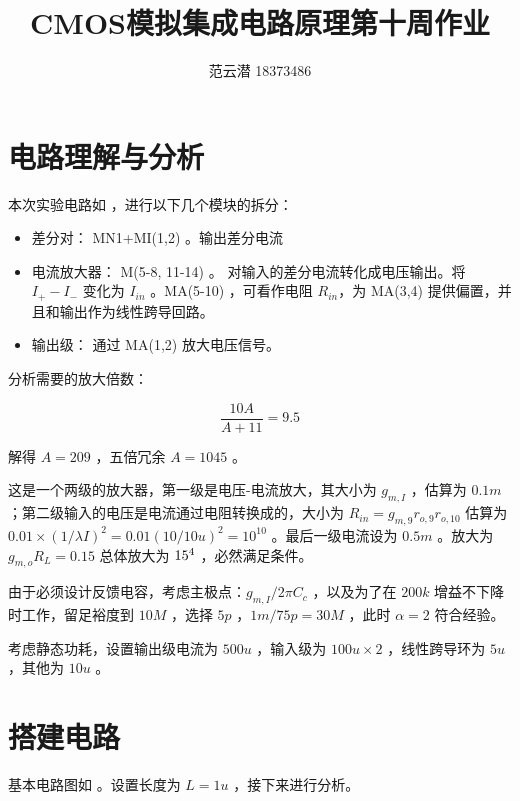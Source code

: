 \documentclass[lang=cn,11pt,a4paper,cite=authoryear]{elegantpaper}
\title{CMOS模拟集成电路原理\quad 第十周作业}
\author{范云潜 18373486}
\institute{微电子学院 184111 班}
\date{\zhtoday}
\begin{document}
\maketitle


\tableofcontents


\section{电路理解与分析}

本次实验电路如  ，进行以下几个模块的拆分：

\begin{itemize}
    \item 差分对： MN1+MI(1,2) 。输出差分电流
    \item 电流放大器： M(5-8, 11-14) 。 对输入的差分电流转化成电压输出。将 \(I_{+} - I_{-}\) 变化为 \(I_{in}\) 。MA(5-10) ，可看作电阻 \(R_{in}\)，为 MA(3,4) 提供偏置，并且和输出作为线性跨导回路。
    \item 输出级： 通过 MA(1,2) 放大电压信号。
\end{itemize}





分析需要的放大倍数： 

\[\frac{10 A}{A + 11} = 9.5\]

解得 \(A = 209\) ，五倍冗余 \(A = 1045\) 。


这是一个两级的放大器，第一级是电压-电流放大，其大小为 \(g_{m,I}\) ，估算为 \(0.1 m\)；第二级输入的电压是电流通过电阻转换成的，大小为 \(R_{in} = g_{m,9} r_{o,9} r_{o,10} \) 估算为 \(0.01 \times (1/\lambda I)^2 = 0.01 (10 / 10u)^2 = 10^{10} \) 。最后一级电流设为 \(0.5 m\) 。放大为 \(g_{m,o} R_L = 0.15\) 总体放大为 \(15 \time 10^4\) ，必然满足条件。

由于必须设计反馈电容，考虑主极点：\(g_{m,I} / 2 \pi C_c\) ，以及为了在 \(200 k\) 增益不下降时工作，留足裕度到 \(10 M\) ，选择 \(5 p\) ，\(1m / 7 5p  = 30 M\) ，此时 \(\alpha = 2\) 符合经验。

考虑静态功耗，设置输出级电流为 \(500 u\) ，输入级为 \(100 u \times 2\) ，线性跨导环为 \(5 u\) ，其他为 \(10 u\) 。

\section{搭建电路} 

基本电路图如  。设置长度为 \(L = 1u\) ，接下来进行分析。
\end{document}
